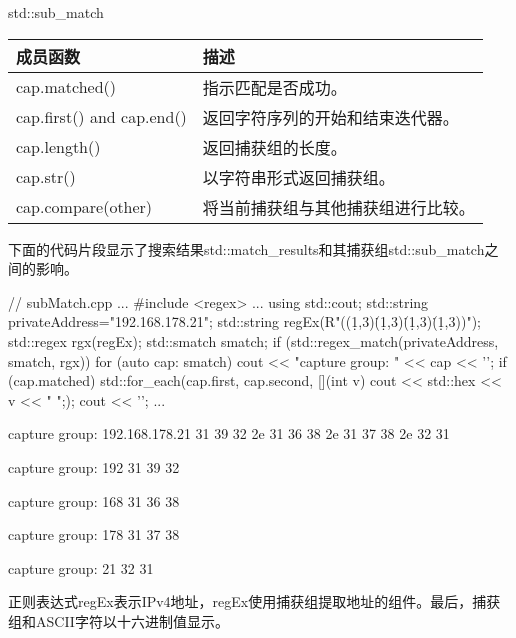 \begin{center}
std::sub\_match
\end{center}

\begin{longtable}[c]{|l|l|}
\hline
\textbf{成员函数} & \textbf{描述}                     \\ \hline
\endfirsthead
%
\endhead
%
cap.matched()            & 指示匹配是否成功。  \\ \hline
cap.first() and cap.end() & 返回字符序列的开始和结束迭代器。    \\ \hline
cap.length()             & 返回捕获组的长度。 \\ \hline
cap.str()                & 以字符串形式返回捕获组。     \\ \hline
cap.compare(other)        & 将当前捕获组与其他捕获组进行比较。 \\ \hline
\end{longtable}

下面的代码片段显示了搜索结果std::match\_results和其捕获组std::sub\_match之间的影响。


\begin{cpp}
// subMatch.cpp
...
#include <regex>
...
using std::cout;
std::string privateAddress="192.168.178.21";
std::string regEx(R"((\d{1,3})\.(\d{1,3})\.(\d{1,3})\.(\d{1,3}))");
std::regex rgx(regEx);
std::smatch smatch;
if (std::regex_match(privateAddress, smatch, rgx)){
	for (auto cap: smatch){
		cout << "capture group: " << cap << '\n';
		if (cap.matched){
			std::for_each(cap.first, cap.second, [](int v){
				cout << std::hex << v << " ";});
			cout << '\n';
		}
	}
}
...
\end{cpp}

\begin{shell}
capture group: 192.168.178.21
31 39 32 2e 31 36 38 2e 31 37 38 2e 32 31

capture group: 192
31 39 32

capture group: 168
31 36 38

capture group: 178
31 37 38

capture group: 21
32 31
\end{shell}

正则表达式regEx表示IPv4地址，regEx使用捕获组提取地址的组件。最后，捕获组和ASCII字符以十六进制值显示。















